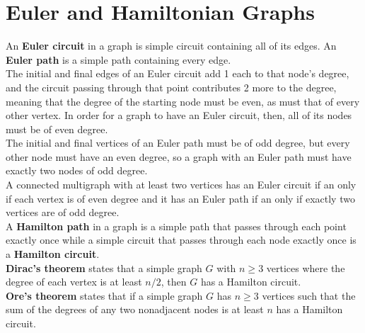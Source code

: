 \documentclass[./Discrete Math.tex]{subfiles}
\begin{document}
	\section{Euler and Hamiltonian Graphs}
		An \textbf{Euler circuit} in a graph is simple circuit containing all of its edges. An \textbf{Euler path} is a simple path containing every edge. \\
		The initial and final edges of an Euler circuit add 1 each to that node's degree, and the circuit passing through that point contributes 2 more to the degree, meaning that the degree of the starting node must be even, as must that of every other vertex. In order for a graph to have an Euler circuit, then, all of its nodes must be of even degree. \\
		The initial and final vertices of an Euler path must be of odd degree, but every other node must have an even degree, so a graph with an Euler path must have exactly two nodes of odd degree. \\
		A connected multigraph with at least two vertices has an Euler circuit if an only if each vertex is of even degree and it has an Euler path if an only if exactly two vertices are of odd degree. \\
		A \textbf{Hamilton path} in a graph is a simple path that passes through each point exactly once while a simple circuit that passes through each node exactly once is a \textbf{Hamilton circuit}. \\
		\textbf{Dirac's theorem} states that a simple graph \(G\) with \(n \ge 3\) vertices where the degree of each vertex is at least \(n / 2\), then \(G\) has a Hamilton circuit. \\
		\textbf{Ore's theorem} states that if a simple graph \(G\) has \(n \ge 3\) vertices such that the sum of the degrees of any two nonadjacent nodes is at least \(n\) has a Hamilton circuit.
\end{document}

